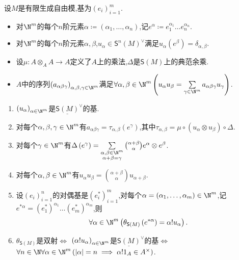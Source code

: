 \begin{proposition}{}{}
	设$M$是有限生成自由模,基为$\left(e_{i}\right)_{i=1}^{m}$.
	\begin{itemize}
		\item 对$\N^{m}$的每个$n$阶元素$\alpha\coloneq\left(\alpha_{1},\ldots,\alpha_{n}\right)$,记$e^{\alpha}\coloneq e_{1}^{\alpha_{1}}\ldots e_{n}^{\alpha_{n}}$.
		\item 对$\N^{m}$的每个$n$阶元素$\alpha,\beta$,$u_{\alpha}\in\mathsf{S}^{n}\left(M\right)^{\vee}$满足$u_{\alpha}\left(e^{\beta}\right)=\delta_{\alpha,\beta}$.
		\item 设$\mu:A\otimes_{A}A\to A$定义了$A$上的乘法,$\Delta$是$\mathsf{S}\left(M\right)$上的典范余乘.
		\item $A$中的序列$\left(a_{\alpha\beta\gamma}\right)_{\alpha,\beta,\gamma\in\N^{m}}$满足$\forall\alpha,\beta\in\N^{m}\left(u_{\alpha}u_{\beta}=\sum\limits_{\gamma\in\N^{m}}a_{\alpha\beta\gamma}u_{\gamma}\right)$.
	\end{itemize}
	\begin{enumerate}
		\item $\left(u_{\alpha}\right)_{\alpha\in\N^{m}}$是$\underline{\mathsf{S}\left(M\right)}^{\vee}$的基.
		\item 对每个$\alpha,\beta,\gamma\in\N^{m}$有$a_{\alpha\beta\gamma}=\tau_{\alpha,\beta}\left(e^{\gamma}\right)$,其中$\tau_{\alpha,\beta}=\mu\circ\left(u_{\alpha}\otimes u_{\beta}\right)\circ\Delta$.
		\item 对每个$\gamma\in\N^{m}$有$\Delta\left(e^{\gamma}\right)=\sum\limits_{\substack{\alpha,\beta\in\N^{m}\\ \alpha+\beta=\gamma}}\binom{\alpha+\beta}{\alpha}e^{\alpha}\otimes e^{\beta}$.
		\item 对每个$\alpha,\beta\in\N^{m}$有$u_{\alpha}u_{\beta}=\binom{\alpha+\beta}{\alpha}u_{\alpha+\beta}$.
		\item 设$\left(e_{i}\right)_{i=1}^{n}$的对偶基是$\left(e_{i}^{\ast}\right)_{i=1}^{m}$,对每个$\alpha=\left(\alpha_{1},\ldots,\alpha_{m}\right)\in\N^{m}$,记$e^{\ast\alpha}=\left(e_{1}^{\ast}\right)^{\alpha_{1}}\ldots\left(e_{m}^{\ast}\right)^{\alpha_{m}}$,则
		\begin{align*}
			\forall\alpha\in\N^{m}\left(\theta_{\mathsf{S}\left(M\right)}\left(e^{\ast\alpha}\right)=\alpha!u_{\alpha}\right).
		\end{align*}
		\item $\theta_{\mathsf{S}\left(M\right)}$是双射$\iff$ $\left(\alpha!u_{\alpha}\right)_{\alpha\in\N^{m}}$是$\underline{\mathsf{S}\left(M\right)}^{\vee}$的基$\iff$ $\forall n\in\N\forall\alpha\in\N^{m}\left(\left|\alpha\right|=n\implies\alpha!1_{A}\in A^{\times}\right)$.
	\end{enumerate}
\end{proposition}

